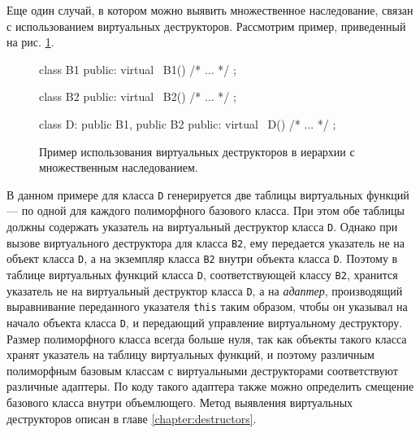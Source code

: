 Еще один случай, в котором можно выявить множественное наследование, связан с использованием виртуальных деструкторов. Рассмотрим пример, приведенный на рис. \ref{listing:multiple_base_vdestructor}.

\begin{figure}[htb!]
\hspace{2cm}
\begin{minipage}[b]{1cm}
\begin{cplusplus}
class B1 {
public:
    virtual ~B1() {/* ... */}
};

class B2 {
public:
    virtual ~B2() {/* ... */}
};

class D: public B1, public B2 {
public:
    virtual ~D() {/* ... */}
};
\end{cplusplus}
\end{minipage}
\caption{Пример использования виртуальных деструкторов в иерархии с множественным наследованием.}
\label{listing:multiple_base_vdestructor}
\end{figure}

В данном примере для класса \lstinline{D} генерируется две таблицы виртуальных функций --- по одной для каждого полиморфного базового класса. При этом обе таблицы должны содержать указатель на виртуальный деструктор класса \lstinline{D}. Однако при вызове виртуального деструктора для класса \lstinline{B2}, ему передается указатель не на объект класса \lstinline{D}, а на экземпляр класса \lstinline{B2} внутри объекта класса \lstinline{D}. Поэтому в таблице виртуальных функций класса \lstinline{D}, соответствующей классу \lstinline{B2}, хранится указатель не на виртуальный деструктор класса \lstinline{D}, а на {\it адаптер}, производящий выравнивание переданного указателя \lstinline{this} таким образом, чтобы он указывал на начало объекта класса \lstinline{D}, и передающий управление виртуальному деструктору. Размер полиморфного класса всегда больше нуля, так как объекты такого класса хранят указатель на таблицу виртуальных функций, и поэтому различным полиморфным базовым классам с виртуальными деструкторами соответствуют различные адаптеры. По коду такого адаптера также можно определить смещение базового класса внутри объемлющего. Метод выявления виртуальных деструкторов описан в главе \ref{chapter:destructors}.

